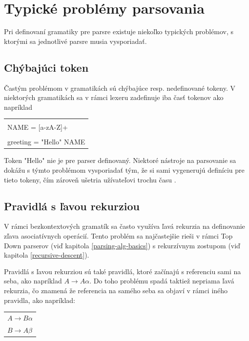 \section{Typické problémy parsovania}
Pri definovaní gramatiky pre parsre existuje niekoľko typických problémov, s ktorými sa jednotlivé parsre musia vysporiadať. 

\subsection{Chýbajúci token}
Častým problémom v gramatikách sú chýbajúce resp. nedefinované tokeny. V niektorých gramatikách sa v rámci lexeru zadefinuje iba časť tokenov ako napríklad

\begin{center}
\begin{tabular}{p{}}
\color{editorGray}{/* Lexer */}\\
NAME = [a-zA-Z]+\\
\color{editorGray}{/* Parser */}\\
greeting = "Hello"{ NAME}
\end{tabular}
\end{center}

Token "Hello"{ }nie je pre parser definovaný. Niektoré nástroje na parsovanie sa dokážu s týmto problémom vysporiadať tým, že si sami vygenerujú definíciu pre tieto tokeny, čím zároveň ušetria užívateľovi trochu času \cite{tomassetti:parsing}.

\subsection{Pravidlá s ľavou rekurziou}\label{left-recursion-rule}
V rámci bezkontextových gramatík sa často využíva ľavá rekurzia na definovanie zľava asociatívnych operácií. Tento problém sa najčastejšie rieši v rámci Top Down parserov (viď kapitola \ref{parsing-alg-basics}) s rekurzívnym zostupom (viď kapitola \ref{recursive-descent}). 

Pravidlá s ľavou rekurziou sú také pravidlá, ktoré začínajú s referenciu sami na seba, ako napríklad $A \rightarrow A\alpha$. Do toho problému spadá taktiež nepriama ľavá rekurzia, čo znamená že referencia na samého seba sa objaví v rámci iného pravidla, ako napríklad:

\begin{center}
\begin{tabular}{p{}}
$A \rightarrow B\alpha$\\
$B \rightarrow A\beta$\\
\end{tabular}
\end{center}

